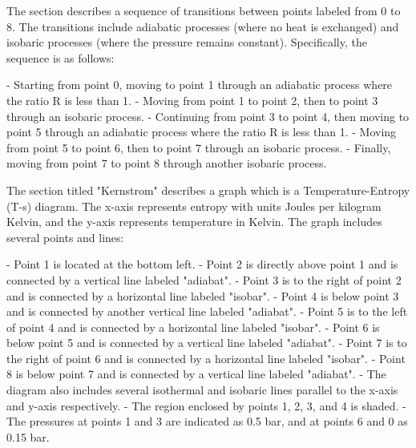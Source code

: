 The section describes a sequence of transitions between points labeled from 0 to 8. The transitions include adiabatic processes (where no heat is exchanged) and isobaric processes (where the pressure remains constant). Specifically, the sequence is as follows:

- Starting from point 0, moving to point 1 through an adiabatic process where the ratio R is less than 1.
- Moving from point 1 to point 2, then to point 3 through an isobaric process.
- Continuing from point 3 to point 4, then moving to point 5 through an adiabatic process where the ratio R is less than 1.
- Moving from point 5 to point 6, then to point 7 through an isobaric process.
- Finally, moving from point 7 to point 8 through another isobaric process.

The section titled "Kernstrom" describes a graph which is a Temperature-Entropy (T-s) diagram. The x-axis represents entropy with units Joules per kilogram Kelvin, and the y-axis represents temperature in Kelvin. The graph includes several points and lines:

- Point 1 is located at the bottom left.
- Point 2 is directly above point 1 and is connected by a vertical line labeled "adiabat".
- Point 3 is to the right of point 2 and is connected by a horizontal line labeled "isobar".
- Point 4 is below point 3 and is connected by another vertical line labeled "adiabat".
- Point 5 is to the left of point 4 and is connected by a horizontal line labeled "isobar".
- Point 6 is below point 5 and is connected by a vertical line labeled "adiabat".
- Point 7 is to the right of point 6 and is connected by a horizontal line labeled "isobar".
- Point 8 is below point 7 and is connected by a vertical line labeled "adiabat".
- The diagram also includes several isothermal and isobaric lines parallel to the x-axis and y-axis respectively.
- The region enclosed by points 1, 2, 3, and 4 is shaded.
- The pressures at points 1 and 3 are indicated as 0.5 bar, and at points 6 and 0 as 0.15 bar.
